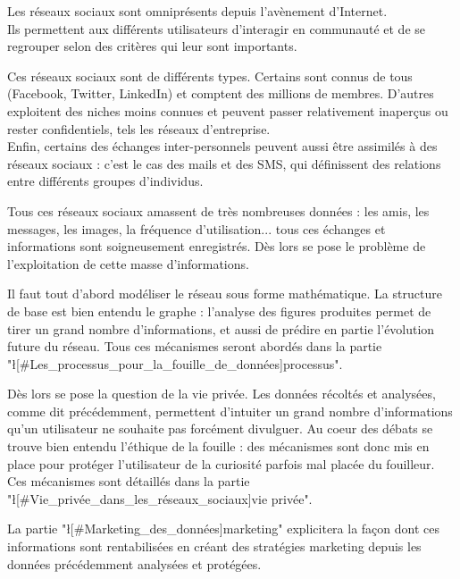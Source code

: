 Les réseaux sociaux sont omniprésents depuis l'avènement d'Internet.\\
Ils permettent aux différents utilisateurs d'interagir en communauté et de se regrouper selon des critères qui leur sont importants.

Ces réseaux sociaux sont de différents types. Certains sont connus de tous (Facebook, Twitter, LinkedIn) et comptent des millions de membres. D'autres exploitent des niches moins connues et peuvent passer relativement inaperçus ou rester confidentiels, tels les réseaux d'entreprise.\\
Enfin, certains des échanges inter-personnels peuvent aussi être assimilés à des réseaux sociaux : c'est le cas des mails et des SMS, qui définissent des relations entre différents groupes d'individus.

Tous ces réseaux sociaux amassent de très nombreuses données : les amis, les messages, les images, la fréquence d'utilisation... tous ces échanges et informations sont soigneusement enregistrés. Dès lors se pose le problème de l'exploitation de cette masse d'informations.

Il faut tout d'abord modéliser le réseau sous forme mathématique. La structure de base est bien entendu le graphe : l'analyse des figures produites permet de tirer un grand nombre d'informations, et aussi de prédire en partie l'évolution future du réseau. Tous ces mécanismes seront abordés dans la partie "\l[#Les_processus_pour_la_fouille_de_données]{processus}".

Dès lors se pose la question de la vie privée. Les données récoltés et analysées, comme dit précédemment, permettent d'intuiter un grand nombre d'informations qu'un utilisateur ne souhaite pas forcément divulguer. Au coeur des débats se trouve bien entendu l'éthique de la fouille : des mécanismes sont donc mis en place pour protéger l'utilisateur de la curiosité parfois mal placée du fouilleur. Ces mécanismes sont détaillés dans la partie "\l[#Vie_privée_dans_les_réseaux_sociaux]{vie privée}".

La partie "\l[#Marketing_des_données]{marketing}" explicitera la façon dont ces informations sont rentabilisées en créant des stratégies marketing depuis les données précédemment analysées et protégées.
